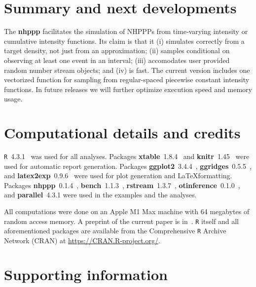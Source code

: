 \documentclass[10pt,letterpaper]{article}
\newcommand{\pkg}[1]{{\bf #1}}
\newcommand{\proglang}[1]{\texttt{#1}}
\begin{document}

\section{Summary and next developments} \label{sec:summary}

The \pkg{nhppp} facilitates the simulation of NHPPPs from time-varying intensity or cumulative intensity functions. Its claim is that it (i) simulates correctly from a target density, not just from an approximation; (ii) samples conditional on observing at least one event in an interval; (iii) accomodates user provided random number stream objects; and (iv) is fast. The current version includes one vectorized function for sampling from regular-spaced piecewise constant intensity functions. In future releases we will further optimize execution speed and memory usage.



\section*{Computational details and credits}

\proglang{R}~4.3.1~\cite{R-program}
was used for all analyses.
Packages
\pkg{xtable}~{1.8.4}~\cite{xtable-package} and
\pkg{knitr}~{1.45}~\cite{knitr-package}
were used for automatic report generation. Packages
\pkg{ggplot2}~{3.4.4}~\cite{ggplot2-package},
\pkg{ggridges}~{0.5.5}~\cite{ggridges-package}, and
\pkg{latex2exp}~{0.9.6}~\cite{latex2exp-package}
were used for plot generation and \LaTeX formatting.
Packages
\pkg{nhppp}~{0.1.4}~\cite{nhppp-package},
\pkg{bench}~{1.1.3}~\cite{bench-package},
\pkg{rstream}~{1.3.7}~\cite{rstream-package},
\pkg{otinference}~{0.1.0}~\cite{otinference-package}, and
\pkg{parallel}~{4.3.1}
were used in the examples and the analyses.

All computations were done on an Apple M1 Max machine with 64 megabytes of random access memory. A preprint of the current paper is in~\cite{trikalinos2024nhppp}.
%
\proglang{R} itself
and all aforementioned packages are available from the Comprehensive
\proglang{R} Archive Network (CRAN) at
\url{https://CRAN.R-project.org/}.



\section*{Supporting information}
\end{document}
